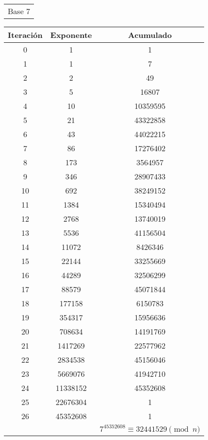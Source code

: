 \documentclass[fleqn]{article}
\begin{document}
\begin{center}
        \newpage
        \begin{tabular}{c}
            Base 7 \\
        \end{tabular}
        \begin{tabular}{c | c | c}
            Iteración & Exponente & Acumulado \\ \hline
            0 & 1 & 1 \\
            1 & 1 & 7 \\
            2 & 2 & 49 \\
            3 & 5 & 16807 \\
            4 & 10 & 10359595 \\
            5 & 21 & 43322858 \\
            6 & 43 & 44022215 \\
            7 & 86 & 17276402 \\
            8 & 173 & 3564957 \\
            9 & 346 & 28907433 \\
            10 & 692 & 38249152 \\
            11 & 1384 & 15340494 \\
            12 & 2768 & 13740019 \\
            13 & 5536 & 41156504 \\
            14 & 11072 & 8426346 \\
            15 & 22144 & 33255669 \\
            16 & 44289 & 32506299 \\
            17 & 88579 & 45071844 \\
            18 & 177158 & 6150783 \\
            19 & 354317 & 15956636 \\
            20 & 708634 & 14191769 \\
            21 & 1417269 & 22577962 \\
            22 & 2834538 & 45156046 \\
            23 & 5669076 & 41942710 \\
            24 & 11338152 & 45352608 \\
            25 & 22676304 & 1 \\
            26 & 45352608 & 1 \\ \hline
            && $ 7^{45352608} \equiv 32441529 \pmod{n} $ 
        \end{tabular}


\end{center}
\end{document}
